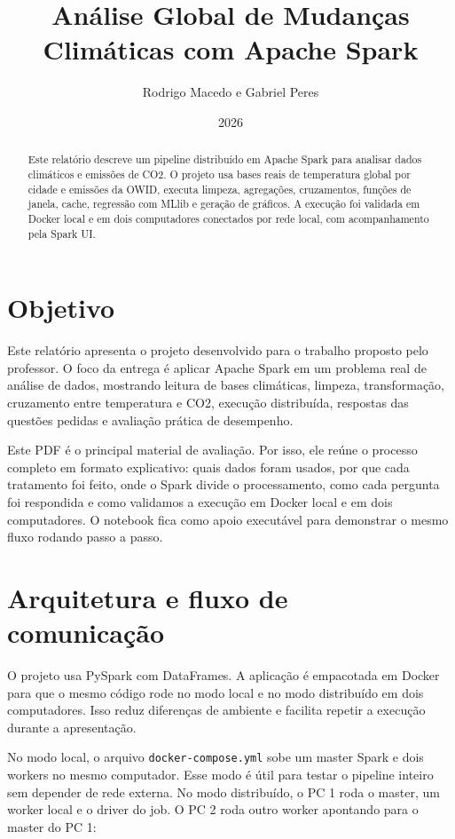 \documentclass[12pt,a4paper]{article}
\title{Análise Global de Mudanças Climáticas com Apache Spark}
\author{Rodrigo Macedo e Gabriel Peres}
\date{2026}
\begin{document}
\maketitle

\begin{abstract}
Este relatório descreve um pipeline distribuído em Apache Spark para analisar dados climáticos e emissões de CO2. O projeto usa bases reais de temperatura global por cidade e emissões da OWID, executa limpeza, agregações, cruzamentos, funções de janela, cache, regressão com MLlib e geração de gráficos. A execução foi validada em Docker local e em dois computadores conectados por rede local, com acompanhamento pela Spark UI.
\end{abstract}

\tableofcontents
\newpage

\section{Objetivo}

Este relatório apresenta o projeto desenvolvido para o trabalho proposto pelo professor. O foco da entrega é aplicar Apache Spark em um problema real de análise de dados, mostrando leitura de bases climáticas, limpeza, transformação, cruzamento entre temperatura e CO2, execução distribuída, respostas das questões pedidas e avaliação prática de desempenho.

Este PDF é o principal material de avaliação. Por isso, ele reúne o processo completo em formato explicativo: quais dados foram usados, por que cada tratamento foi feito, onde o Spark divide o processamento, como cada pergunta foi respondida e como validamos a execução em Docker local e em dois computadores. O notebook  fica como apoio executável para demonstrar o mesmo fluxo rodando passo a passo.

\section{Arquitetura e fluxo de comunicação}

O projeto usa PySpark com DataFrames. A aplicação é empacotada em Docker para que o mesmo código rode no modo local e no modo distribuído em dois computadores. Isso reduz diferenças de ambiente e facilita repetir a execução durante a apresentação.

No modo local, o arquivo \texttt{docker-compose.yml} sobe um master Spark e dois workers no mesmo computador. Esse modo é útil para testar o pipeline inteiro sem depender de rede externa. No modo distribuído, o PC 1 roda o master, um worker local e o driver do job. O PC 2 roda outro worker apontando para o master do PC 1:
\end{document}

